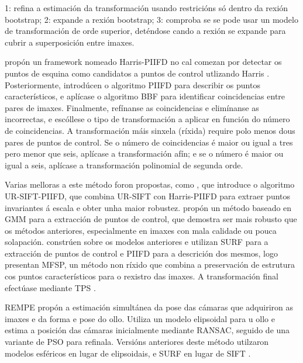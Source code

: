1: refina a estimación da transformación usando restricións só dentro da rexión bootstrap; 
2: expande a rexión bootstrap;
3: comproba se se pode usar un modelo de transformación de orde superior, deténdose cando a rexión se expande para cubrir a superposición entre imaxes.


\cite{piifd} propón un framework nomeado Harris-PIIFD no cal comezan por detectar os puntos de esquina como candidatos a puntos de control utlizando Harris \cite{Harris1988ACC}.
Posteriormente, introdúcen o algoritmo \gls{PIIFD} para describir os puntos característicos, e aplícase o algoritmo \gls{BBF} \cite{BBF} para identificar coincidencias entre pares de imaxes.
Finalmente, refínanse as coincidencias e elimínanse as incorrectas, e escóllese o tipo de transformación a aplicar en función do número de coincidencias.
A transformación máis sinxela (ríxida) require polo menos dous pares de puntos de control. Se o número de coincidencias é maior ou igual a tres pero menor que seis, aplícase a transformación afín; e se o número é maior ou igual a seis, aplícase a transformación polinomial de segunda orde.

Varias melloras a este método foron propostas, como \cite{ur-sift}, que introduce o algoritmo \gls{UR-SIFT-PIIFD}, que combina UR-SIFT con Harris-PIIFD para extraer puntos invariantes á escala e obter unha maior robustez.
\cite{GMM} propón un método baseado en \gls{GMM} para a extracción de puntos de control, que demostra ser mais robusto que os métodos anteriores, especialmente en imaxes con mala calidade ou pouca solapación.
\cite{MFSP} constrúen sobre os modelos anteriores e utilizan \gls{SURF} para a extracción de puntos de control e \gls{PIIFD} para a descrición dos mesmos, 
logo presentan \gls{MFSP}, un método non ríxido que combina a preservación de estrutura cos puntos característicos para o rexistro das imaxes. 
A transformación final efectúase mediante \gls{TPS} \cite{TPS}.

\gls{REMPE} \cite{rempe} propón a estimación simultánea da pose das cámaras que adquiriron as imaxes e da forma e pose do ollo. Utiliza un modelo elipsoidal para u ollo e estima a posición das cámaras inicialmente mediante RANSAC, seguido de una variante de \gls{PSO} \cite{pso} para refinala. 
Versións anteriores deste método utilzaron modelos esféricos en lugar de elipsoidais, e \gls{SURF} en lugar de SIFT \cite{H-M16}.


